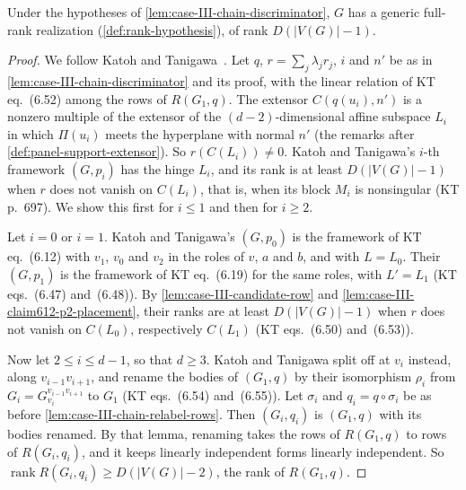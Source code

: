 \begin{lemma}
  \label{lem:case-III-chain-dispatch}
  \leanok
  Under the hypotheses of \cref{lem:case-III-chain-discriminator}, $G$
  has a generic full-rank realization (\cref{def:rank-hypothesis}), of
  rank $D(|V(G)| - 1)$.
\end{lemma}
\begin{proof}
  \leanok
  We follow Katoh and Tanigawa~\cite[pp.~692--698]{katohTanigawa2011}.
  Let $q$, $r = \sum_j \lambda_j r_j$, $i$ and $n'$ be as in
  \cref{lem:case-III-chain-discriminator} and its proof, with the linear
  relation of KT eq.~(6.52) among the rows of $R(G_1, q)$. The extensor
  $C(q(u_i), n')$ is a nonzero multiple of the extensor of the
  $(d-2)$-dimensional affine subspace $L_i$ in which $\Pi(u_i)$ meets
  the hyperplane with normal $n'$ (the remarks after
  \cref{def:panel-support-extensor}). So $r(C(L_i)) \neq 0$. Katoh and
  Tanigawa's $i$-th framework $(G, p_i)$ has the hinge $L_i$, and its
  rank is at least $D(|V(G)| - 1)$ when $r$ does not vanish on $C(L_i)$,
  that is, when its block $M_i$ is nonsingular (KT p.~697). We show this
  first for $i \le 1$ and then for $i \ge 2$.

  Let $i = 0$ or $i = 1$. Katoh and Tanigawa's $(G, p_0)$ is the
  framework of KT eq.~(6.12) with $v_1$, $v_0$ and $v_2$ in the roles of
  $v$, $a$ and $b$, and with $L = L_0$. Their $(G, p_1)$ is the
  framework of KT eq.~(6.19) for the same roles, with $L' = L_1$ (KT
  eqs.~(6.47) and~(6.48)). By \cref{lem:case-III-candidate-row} and
  \cref{lem:case-III-claim612-p2-placement}, their ranks are at least
  $D(|V(G)| - 1)$ when $r$ does not vanish on $C(L_0)$, respectively
  $C(L_1)$ (KT eqs.~(6.50) and~(6.53)).

  Now let $2 \le i \le d - 1$, so that $d \ge 3$. Katoh and Tanigawa
  split off at $v_i$ instead, along $v_{i-1} v_{i+1}$, and rename the
  bodies of $(G_1, q)$ by their isomorphism $\rho_i$ from
  $G_i = G_{v_i}^{v_{i-1} v_{i+1}}$ to $G_1$ (KT eqs.~(6.54)
  and~(6.55)). Let $\sigma_i$ and $q_i = q \circ \sigma_i$ be as before
  \cref{lem:case-III-chain-relabel-rows}. Then $(G_i, q_i)$ is $(G_1, q)$
  with its bodies renamed. By that lemma, renaming takes the rows of
  $R(G_1, q)$ to rows of $R(G_i, q_i)$, and it keeps linearly independent
  forms linearly independent. So
  $\operatorname{rank} R(G_i, q_i) \ge D(|V(G)| - 2)$, the rank of
  $R(G_1, q)$.


\end{proof}
